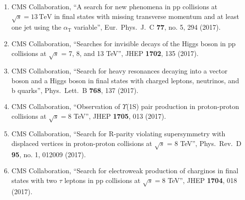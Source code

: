 \begin{enumerate}
\item CMS Collaboration, ``A search for new phenomena in pp collisions at $\sqrt{s} = 13\,\text {TeV} $ in final states with missing transverse momentum and at least one jet using the $\alpha _{\mathrm {T}}$ variable'', Eur.\ Phys.\ J.\ C {\bf 77}, no. 5, 294 (2017).

\item CMS Collaboration, ``Searches for invisible decays of the Higgs boson in pp collisions at $\sqrt{s}$ = 7, 8, and 13 TeV'', JHEP {\bf 1702}, 135 (2017).

\item CMS Collaboration, ``Search for heavy resonances decaying into a vector boson and a Higgs boson in final states with charged leptons, neutrinos, and b quarks'', Phys.\ Lett.\ B {\bf 768}, 137 (2017).

\item CMS Collaboration, ``Observation of $\Upsilon$(1S) pair production in proton-proton collisions at $ \sqrt{s}=8 $ TeV'', JHEP {\bf 1705}, 013 (2017).

\item CMS Collaboration, ``Search for R-parity violating supersymmetry with displaced vertices in proton-proton collisions at $\sqrt{s}$ = 8 TeV'', Phys.\ Rev.\ D {\bf 95}, no. 1, 012009 (2017).

\item CMS Collaboration, ``Search for electroweak production of charginos in final states with two $\tau$ leptons in pp collisions at $ \sqrt{s}=8 $ TeV'', JHEP {\bf 1704}, 018 (2017).


\end{enumerate}
